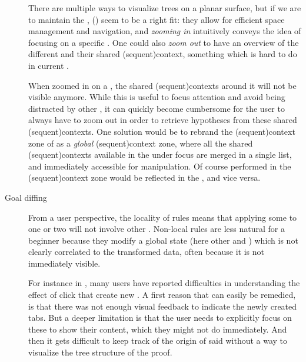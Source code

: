 \begin{scope}
\begin{description}
    There are multiple ways to visualize trees on a planar surface, but if we
    are to maintain the  ,  () seem to be a right fit: they allow for efficient
    space management and navigation, and \emph{zooming in} intuitively conveys
    the idea of focusing on a specific . One could also \emph{zoom
    out} to have an overview of the different  and their shared
    \kl(sequent){context}, something which is hard to do in current .
    
    When zoomed in on a , the shared \kl(sequent){contexts} around
    it will not be visible anymore. While this is useful to focus attention and
    avoid being distracted by other , it can quickly become
    cumbersome for the user to always have to zoom out in order to retrieve
    hypotheses from these shared \kl(sequent){contexts}. One solution would be
    to rebrand the \kl(sequent){context} zone of  as a \emph{global}
    \kl(sequent){context} zone, where all the shared \kl(sequent){contexts}
    available in the  under focus are merged in a single list, and
    immediately accessible for manipulation. Of course  performed in the
    \kl(sequent){context} zone would be reflected in the , and
    vice versa.

  \item[Goal diffing] From a user perspective, the locality of rules
    means that applying some  to one or two  will not involve
    other . Non-local rules are less natural
    for a beginner because they modify a global state (here other  and
    ) which is not clearly correlated to the transformed data,
    often because it is not immediately visible.

    For instance in , many users have reported difficulties in
    understanding the effect of click  that create new . A first
    reason that can easily be remedied, is that there was not enough visual
    feedback to indicate the newly created tabs. But a deeper limitation is that
    the user needs to explicitly focus on these  to show their content,
    which they might not do immediately. And then it gets difficult to keep
    track of the origin of said  without a way to visualize the tree
    structure of the proof.


\end{description}
\end{scope}
